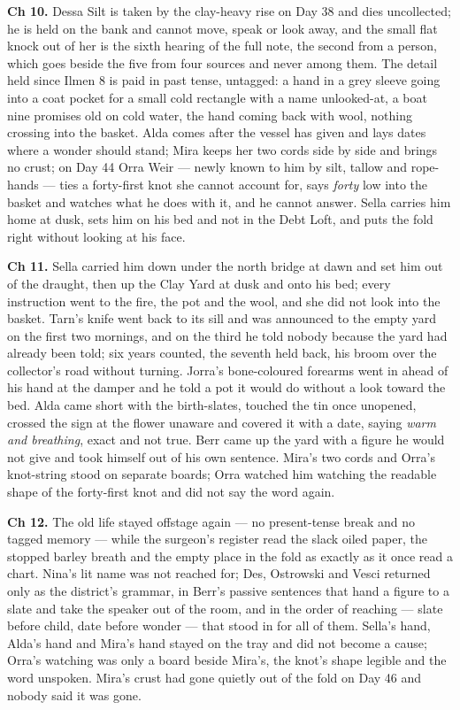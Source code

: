 \documentclass{design/chronicle}
\begin{document}
{\textbf{Ch 10.} Dessa Silt is taken by the clay-heavy rise on Day 38 and dies uncollected; he is held on the bank and cannot move, speak or look away, and the small flat knock out of her is the sixth hearing of the full note, the second from a person, which goes beside the five from four sources and never among them. The detail held since Ilmen 8 is paid in past tense, untagged: a hand in a grey sleeve going into a coat pocket for a small cold rectangle with a name unlooked-at, a boat nine promises old on cold water, the hand coming back with wool, nothing crossing into the basket. Alda comes after the vessel has given and lays dates where a wonder should stand; Mira keeps her two cords side by side and brings no crust; on Day 44 Orra Weir --- newly known to him by silt, tallow and rope-hands --- ties a forty-first knot she cannot account for, says \emph{forty} low into the basket and watches what he does with it, and he cannot answer. Sella carries him home at dusk, sets him on his bed and not in the Debt Loft, and puts the fold right without looking at his face.

\textbf{Ch 11.} Sella carried him down under the north bridge at dawn and set him out of the draught, then up the Clay Yard at dusk and onto his bed; every instruction went to the fire, the pot and the wool, and she did not look into the basket. Tarn’s knife went back to its sill and was announced to the empty yard on the first two mornings, and on the third he told nobody because the yard had already been told; six years counted, the seventh held back, his broom over the collector’s road without turning. Jorra’s bone-coloured forearms went in ahead of his hand at the damper and he told a pot it would do without a look toward the bed. Alda came short with the birth-slates, touched the tin once unopened, crossed the sign at the flower unaware and covered it with a date, saying \emph{warm and breathing}, exact and not true. Berr came up the yard with a figure he would not give and took himself out of his own sentence. Mira’s two cords and Orra’s knot-string stood on separate boards; Orra watched him watching the readable shape of the forty-first knot and did not say the word again.

\textbf{Ch 12.} The old life stayed offstage again --- no present-tense break and no tagged memory --- while the surgeon’s register read the slack oiled paper, the stopped barley breath and the empty place in the fold as exactly as it once read a chart. Nina’s lit name was not reached for; Des, Ostrowski and Vesci returned only as the district’s grammar, in Berr’s passive sentences that hand a figure to a slate and take the speaker out of the room, and in the order of reaching --- slate before child, date before wonder --- that stood in for all of them. Sella’s hand, Alda’s hand and Mira’s hand stayed on the tray and did not become a cause; Orra’s watching was only a board beside Mira’s, the knot’s shape legible and the word unspoken. Mira’s crust had gone quietly out of the fold on Day 46 and nobody said it was gone.

}
\end{document}
